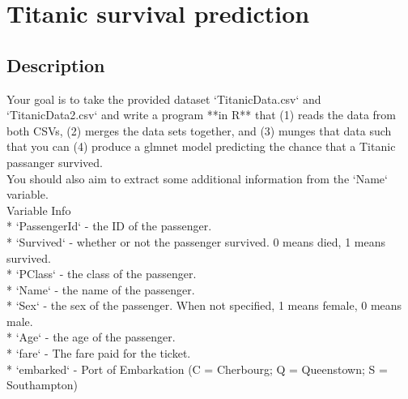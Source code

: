 \documentclass[11pt]{article}
\begin{document}
\section*{Titanic survival prediction}

\subsection*{Description}  %
%
%
\small
Your goal is to take the provided dataset `TitanicData.csv` and `TitanicData2.csv` and write a program **in R** that (1) reads the data from both CSVs, (2) merges the data sets together, and (3) munges that data such that you can (4) produce a glmnet model predicting the chance that a Titanic passanger survived.\\
You should also aim to extract some additional information from the `Name` variable.\\
Variable Info\\
* `PassengerId` - the ID of the passenger.\\
* `Survived` - whether or not the passenger survived.  0 means died, 1 means survived.\\
* `PClass` - the class of the passenger.\\
* `Name` - the name of the passenger.\\
* `Sex` - the sex of the passenger. When not specified, 1 means female, 0 means male.\\
* `Age` - the age of the passenger.\\
* `fare` - The fare paid for the ticket.\\
* `embarked` - Port of Embarkation (C = Cherbourg; Q = Queenstown; S = Southampton)\\
\end{document}
